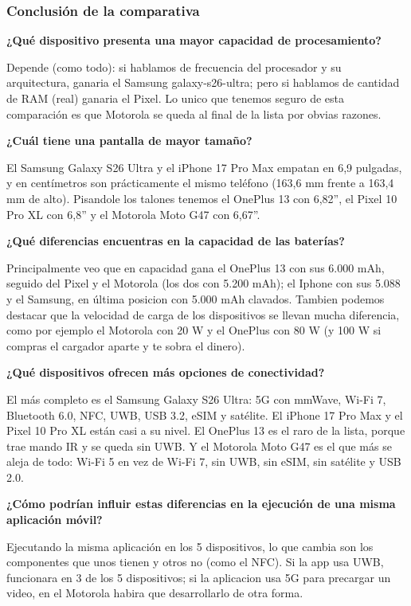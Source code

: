 \documentclass[11pt,a4paper]{article}
\newcommand{\campo}[1]{\textbf{\color{navy}#1}}
\begin{document}
	\subsubsection*{Conclusión de la comparativa}
	
	\campo{¿Qué dispositivo presenta una mayor capacidad de procesamiento?}
	
	Depende (como todo): si hablamos de frecuencia del procesador y su arquitectura, ganaria el Samsung galaxy-s26-ultra; pero si hablamos de cantidad de RAM (real) ganaria el Pixel. Lo unico que tenemos seguro de esta comparación es que Motorola se queda al final de la lista por obvias razones.
	
	\campo{¿Cuál tiene una pantalla de mayor tamaño?}
	
	El Samsung Galaxy S26 Ultra y el iPhone 17 Pro Max empatan en 6,9 pulgadas, y en centímetros son prácticamente el mismo teléfono (163,6 mm frente a 163,4 mm de alto). Pisandole los talones tenemos el OnePlus 13 con 6,82'', el Pixel 10 Pro XL con 6,8'' y el Motorola Moto G47 con 6,67''.
	
	\campo{¿Qué diferencias encuentras en la capacidad de las baterías?}
	
	Principalmente veo que en capacidad gana el OnePlus 13 con sus 6.000 mAh, seguido del Pixel y el Motorola (los dos con 5.200 mAh); el Iphone con sus 5.088 y el Samsung, en última posicion con 5.000 mAh clavados. Tambien podemos destacar que la velocidad de carga de los dispositivos se llevan mucha diferencia, como por ejemplo el Motorola con 20 W y el OnePlus con 80 W (y 100 W si compras el cargador aparte y te sobra el dinero).
	
	\campo{¿Qué dispositivos ofrecen más opciones de conectividad?}
	
	El más completo es el Samsung Galaxy S26 Ultra: 5G con mmWave, Wi-Fi 7, Bluetooth 6.0, NFC, UWB, USB 3.2, eSIM y satélite. El iPhone 17 Pro Max y el Pixel 10 Pro XL están casi a su nivel. El OnePlus 13 es el raro de la lista, porque trae mando IR y se queda sin UWB. Y el Motorola Moto G47 es el que más se aleja de todo: Wi-Fi 5 en vez de Wi-Fi 7, sin UWB, sin eSIM, sin satélite y USB 2.0.
	
	\campo{¿Cómo podrían influir estas diferencias en la ejecución de una misma aplicación móvil?}
	
	Ejecutando la misma aplicación en los 5 dispositivos, lo que cambia son los componentes que unos tienen y otros no (como el NFC). Si la app usa UWB, funcionara en 3 de los 5 dispositivos; si la aplicacion usa 5G para precargar un video, en el Motorola habira que desarrollarlo de otra forma.
	
\end{document}
